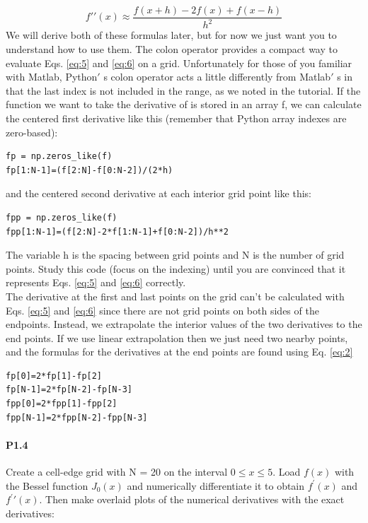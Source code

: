 \documentclass{book}
\theoremstyle{plain}
\theoremstyle{definition}
\numberwithin{exm}{chapter}
\theoremstyle{remark}
\theoremstyle{summary}
\theoremstyle{overview}
\begin{document}
\begin{equation} \label{eq:6}
	f\prime\prime(x) \approx \frac{f(x+h) - 2f(x)+f(x-h)}{h^2}
\end{equation}
We will derive both of these formulas later, but for now we just want you to understand how to use them. The colon operator provides a compact way to evaluate Eqs. \eqref{eq:5} and \eqref{eq:6} on a grid. Unfortunately for those of you familiar with Matlab, Python$'$ s colon operator acts a little differently from Matlab$'$ s in that the last index is not included in the range, as we noted in the tutorial. If the function we want to take the derivative of is stored in an array f, we can calculate the centered first derivative like this (remember that Python array indexes are zero-based):
\begin{lstlisting}
fp = np.zeros_like(f)
fp[1:N-1]=(f[2:N]-f[0:N-2])/(2*h)
\end{lstlisting}
and the centered second derivative at each interior grid point like this:
\begin{lstlisting}
fpp = np.zeros_like(f) 
fpp[1:N-1]=(f[2:N]-2*f[1:N-1]+f[0:N-2])/h**2
\end{lstlisting}

The variable h is the spacing between grid points and N is the number of grid points. Study this code (focus on the indexing) until you are convinced that it represents Eqs. \eqref{eq:5} and \eqref{eq:6} correctly. \\The derivative at the first and last points on the grid can\rq t be calculated with Eqs.  \eqref{eq:5} and \eqref{eq:6} since there are not grid points on both sides of the endpoints. Instead, we extrapolate the interior values of the two derivatives to the end points. If we use linear extrapolation then we just need two nearby points, and the formulas for the derivatives at the end points are found using Eq. \eqref{eq:2}
\begin{lstlisting}
fp[0]=2*fp[1]-fp[2] 
fp[N-1]=2*fp[N-2]-fp[N-3] 
fpp[0]=2*fpp[1]-fpp[2] 
fpp[N-1]=2*fpp[N-2]-fpp[N-3]
\end{lstlisting}

\paragraph*{P1.4}
Create a cell-edge grid with N = 20 on the interval $0 \leq x \leq 5$. Load $f(x)$ with the Bessel function $J_0(x)$ and numerically differentiate it to obtain $f^\prime(x)$ and $f^\prime\prime(x)$. Then make overlaid plots of the numerical derivatives with the exact derivatives:
\end{document}
